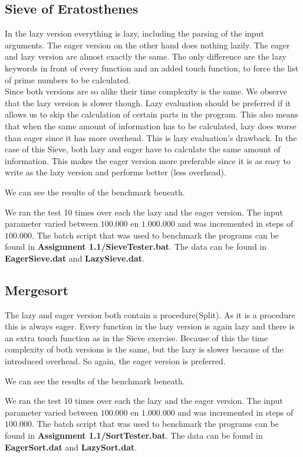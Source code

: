\documentclass[12pt, a4paper]{article}
\begin{document}
\subsection*{Sieve of Eratosthenes}
In the lazy version everything is lazy, including the parsing of the input arguments. The eager version on the other hand does nothing lazily. The eager and lazy version are almost exactly the same. The only difference are the lazy keywords in front of every function and an added touch function, to force the list of prime numbers to be calculated.\\
Since both versions are so alike their time complexity is the same. We observe that the lazy version is slower though. Lazy evaluation should be preferred if it allows us to skip the calculation of certain parts in the program. This also means that when the same amount of information has to be calculated, lazy does worse than eager since it has more overhead. This is lazy evaluation's drawback. In the case of this Sieve, both lazy and eager have to calculate the same amount of information. This makes the eager version more preferable since it is as easy to write as the lazy version and performs better (less overhead).

We can see the results of the benchmark beneath.
\begin{center}

\end{center}
We ran the test 10 times over each the lazy and the eager version. The input parameter varied between $100.000$ en $1.000.000$ and was incremented in steps of $100.000$. The batch script that was used to benchmark the programs can be found in \textbf{Assignment 1.1/SieveTester.bat}. The data can be found in \textbf{EagerSieve.dat} and \textbf{LazySieve.dat}.
\subsection*{Mergesort}
The lazy and eager version both contain a procedure(Split). As it is a procedure this is always eager. Every function in the lazy version is again lazy and there is an extra touch function as in the Sieve exercise. Because of this the time complexity of both versions is the same, but the lazy is slower because of the introduced overhead. So again, the eager version is preferred.

We can see the results of the benchmark beneath.
\begin{center}

\end{center}
We ran the test 10 times over each the lazy and the eager version. The input parameter varied between $100.000$ en $1.000.000$ and was incremented in steps of $100.000$. The batch script that was used to benchmark the programs can be found in \textbf{Assignment 1.1/SortTester.bat}. The data can be found in \textbf{EagerSort.dat} and \textbf{LazySort.dat}.
\end{document}
